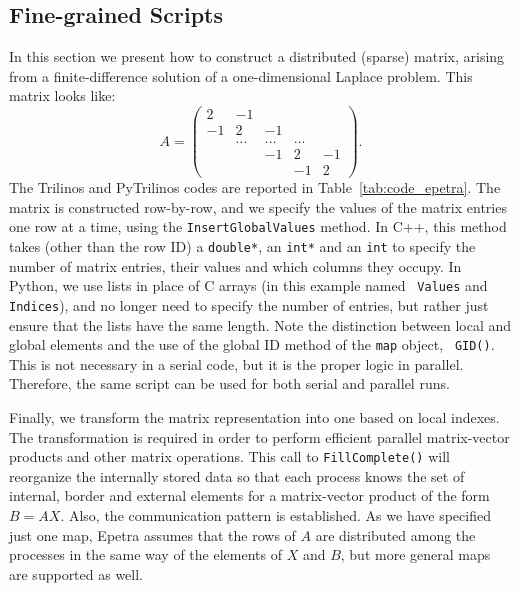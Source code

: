 \documentclass[acmtocl]{acmtrans2m}
\begin{document}
\subsection{Fine-grained Scripts}
\label{sec:fine}

In this section we present how to construct a distributed (sparse)
matrix, arising from a finite-difference solution of a
one-dimensional Laplace problem. This matrix looks like:
\begin{equation*}
  A = \begin{pmatrix}
     2 & -1     &        &        &    \\
    -1 &  2     & -1     &        &    \\
       & \ldots & \ldots & \ldots &    \\
       &        & -1     & 2      & -1 \\
       &        &        & -1     & 2
  \end{pmatrix}.
\end{equation*}
The Trilinos and PyTrilinos codes are reported in
Table~\ref{tab:code_epetra}.  The matrix is constructed row-by-row,
and we specify the values of the matrix entries one row at a time,
using the {\tt InsertGlobalValues} method.  In C++, this method takes
(other than the row ID)
a {\tt double*}, an {\tt int*} and an {\tt int}  to specify the number
of matrix entries, their values and which columns they occupy.  In
Python, we use lists in place of C arrays (in this example named {\tt
  Values} and {\tt Indices}), and no longer need to specify the number
of entries, but rather just ensure that the lists have the same
length.  Note the distinction between local and global elements and
the use of the global ID method of the {\tt map} object, {\tt
GID()}. This is not necessary in a serial code, but it is the proper
logic in parallel. Therefore, the same script can be used for both
serial and parallel runs.

Finally, we transform the matrix representation into one based on
local indexes. The transformation is required in order to perform
efficient parallel matrix-vector products and other matrix
operations. This call to {\tt FillComplete()} will reorganize the
internally stored data so that each process knows the set of internal,
border and external elements for a matrix-vector product of the form
$B = AX$. Also, the communication pattern is established. As we have
specified just one map, Epetra assumes that the rows of $A$ are
distributed among the processes in the same way of the elements of $X$
and $B$, but more general maps are supported as well.
\end{document}
